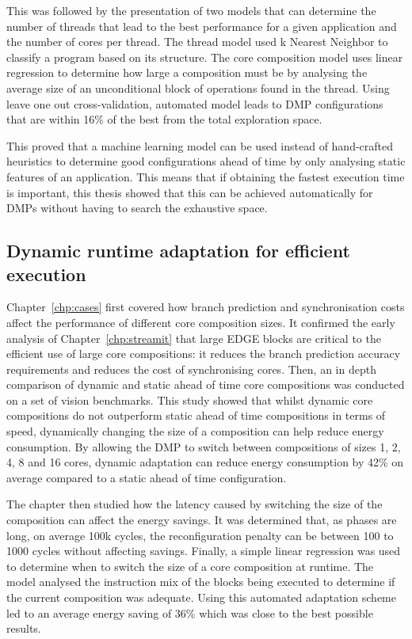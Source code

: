 This was followed by the presentation of two models that can determine the number of threads that lead to the best performance for a given application and the number of cores per thread.
The thread model used k Nearest Neighbor to classify a program based on its structure.
The core composition model uses linear regression to determine how large a composition must be by analysing the average size of an unconditional block of operations found in the thread.
Using leave one out cross-validation, automated model leads to DMP configurations that are within 16\% of the best from the total exploration space.

This proved that a machine learning model can be used instead of hand-crafted heuristics to determine good configurations ahead of time by only analysing static features of an application.
This means that if obtaining the fastest execution time is important, this thesis showed that this can be achieved automatically for DMPs without having to search the exhaustive space.

\subsection{Dynamic runtime adaptation for efficient execution}

Chapter~\ref{chp:cases} first covered how branch prediction and synchronisation costs affect the performance of different core composition sizes.
It confirmed the early analysis of Chapter~\ref{chp:streamit} that large EDGE blocks are critical to the efficient use of large core compositions: it reduces the branch prediction accuracy requirements and reduces the cost of synchronising cores.
Then, an in depth comparison of dynamic and static ahead of time core compositions was conducted on a set of vision benchmarks.
This study showed that whilst dynamic core compositions do not outperform static ahead of time compositions in terms of speed, dynamically changing the size of a composition can help reduce energy consumption.
By allowing the DMP to switch between compositions of sizes 1, 2, 4, 8 and 16 cores, dynamic adaptation can reduce energy consumption by 42\% on average compared to a static ahead of time configuration.

The chapter then studied how the latency caused by switching the size of the composition can affect the energy savings.
It was determined that, as phases are long, on average 100k cycles, the reconfiguration penalty can be between 100 to 1000 cycles without affecting savings.
Finally, a simple linear regression was used to determine when to switch the size of a core composition at runtime.
The model analysed the instruction mix of the blocks being executed to determine if the current composition was adequate.
Using this automated adaptation scheme led to an average energy saving of 36\% which was close to the best possible results.

